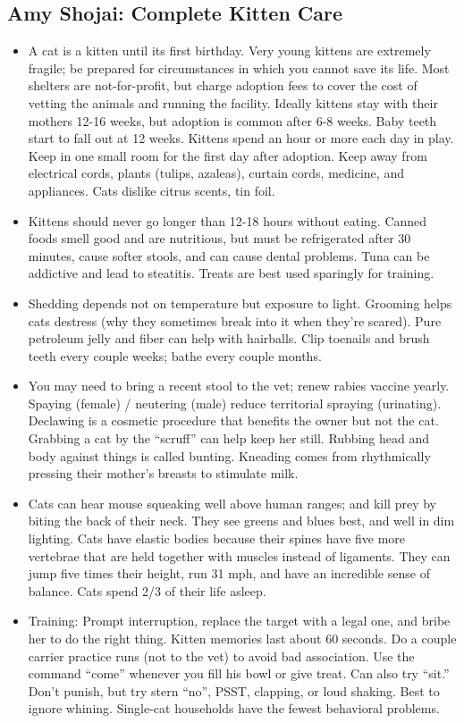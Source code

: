\documentclass[
]{article}
\begin{document}
\hypertarget{amy-shojai-complete-kitten-care}{%
\subsection{Amy Shojai: Complete Kitten
Care}\label{amy-shojai-complete-kitten-care}}

\begin{itemize}
\item
  A cat is a kitten until its first birthday. Very young kittens are
  extremely fragile; be prepared for circumstances in which you cannot
  save its life. Most shelters are not-for-profit, but charge adoption
  fees to cover the cost of vetting the animals and running the
  facility. Ideally kittens stay with their mothers 12-16 weeks, but
  adoption is common after 6-8 weeks. Baby teeth start to fall out at 12
  weeks. Kittens spend an hour or more each day in play. Keep in one
  small room for the first day after adoption. Keep away from electrical
  cords, plants (tulips, azaleas), curtain cords, medicine, and
  appliances. Cats dislike citrus scents, tin foil.
\item
  Kittens should never go longer than 12-18 hours without eating. Canned
  foods smell good and are nutritious, but must be refrigerated after 30
  minutes, cause softer stools, and can cause dental problems. Tuna can
  be addictive and lead to steatitis. Treats are best used sparingly for
  training.
\item
  Shedding depends not on temperature but exposure to light. Grooming
  helps cats destress (why they sometimes break into it when they're
  scared). Pure petroleum jelly and fiber can help with hairballs. Clip
  toenails and brush teeth every couple weeks; bathe every couple
  months.
\item
  You may need to bring a recent stool to the vet; renew rabies vaccine
  yearly. Spaying (female) / neutering (male) reduce territorial
  spraying (urinating). Declawing is a cosmetic procedure that benefits
  the owner but not the cat. Grabbing a cat by the ``scruff'' can help
  keep her still. Rubbing head and body against things is called
  bunting. Kneading comes from rhythmically pressing their mother's
  breasts to stimulate milk.
\item
  Cats can hear mouse squeaking well above human ranges; and kill prey
  by biting the back of their neck. They see greens and blues best, and
  well in dim lighting. Cats have elastic bodies because their spines
  have five more vertebrae that are held together with muscles instead
  of ligaments. They can jump five times their height, run 31 mph, and
  have an incredible sense of balance. Cats spend 2/3 of their life
  asleep.
\item
  Training: Prompt interruption, replace the target with a legal one,
  and bribe her to do the right thing. Kitten memories last about 60
  seconds. Do a couple carrier practice runs (not to the vet) to avoid
  bad association. Use the command ``come'' whenever you fill his bowl
  or give treat. Can also try ``sit.'' Don't punish, but try stern
  ``no'', PSST, clapping, or loud shaking. Best to ignore whining.
  Single-cat households have the fewest behavioral problems.
\end{itemize}
\end{document}
